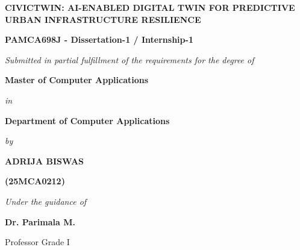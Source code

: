 \documentclass[12pt,a4paper]{report}
\begin{document}

\begin{titlepage}
\thispagestyle{empty}
\begin{center}
    {\fontsize{16pt}{20pt}\selectfont \textbf{CIVICTWIN: AI-ENABLED DIGITAL TWIN FOR PREDICTIVE URBAN INFRASTRUCTURE RESILIENCE}\par}
    \vspace{1.5cm}
    
    {\fontsize{13pt}{16pt}\selectfont \textbf{PAMCA698J - Dissertation-1 / Internship-1}\par}
    \vspace{1.0cm}
    
    {\fontsize{12pt}{15pt}\selectfont \textit{Submitted in partial fulfillment of the requirements for the degree of}\par}
    \vspace{0.4cm}
    
    {\fontsize{14pt}{18pt}\selectfont \textbf{Master of Computer Applications}\par}
    \vspace{0.3cm}
    {\fontsize{12pt}{15pt}\selectfont \textit{in}\par}
    \vspace{0.3cm}
    {\fontsize{13pt}{16pt}\selectfont \textbf{Department of Computer Applications}\par}
    \vspace{1.0cm}
    
    {\fontsize{12pt}{15pt}\selectfont \textit{by}\par}
    \vspace{0.3cm}
    {\fontsize{13pt}{16pt}\selectfont \textbf{ADRIJA BISWAS}\par}
    {\fontsize{13pt}{16pt}\selectfont \textbf{(25MCA0212)}\par}
    \vspace{1.0cm}
    
    {\fontsize{12pt}{15pt}\selectfont \textit{Under the guidance of}\par}
    \vspace{0.3cm}
    {\fontsize{13pt}{16pt}\selectfont \textbf{Dr. Parimala M.}\par}
    {\fontsize{11pt}{14pt}\selectfont Professor Grade I\par}
    \vspace{1.0cm}
    

\end{center}
\end{titlepage}
\end{document}
